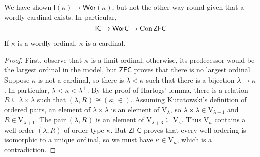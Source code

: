 We have shown \( \mathsf{I}(\kappa) \to \mathsf{Wor}(\kappa) \), but not the other way round given that a wordly cardinal exists.
In particular,
\[ \mathsf{IC} \to \mathsf{WorC} \to \operatorname{Con}{\mathsf{ZFC}} \]
\begin{theorem}
    If \( \kappa \) is a wordly ordinal, \( \kappa \) is a cardinal.
\end{theorem}
\begin{proof}
    First, observe that \( \kappa \) is a limit ordinal; otherwise, its predecessor would be the largest ordinal in the model, but \( \mathsf{ZFC} \) proves that there is no largest ordinal.
    Suppose \( \kappa \) is not a cardinal, so there is \( \lambda < \kappa \) such that there is a bijection \( \lambda \to \kappa \).
    In particular, \( \lambda < \kappa < \lambda^+ \).
    By the proof of Hartogs' lemma, there is a relation \( R \subseteq \lambda \times \lambda \) such that \( (\lambda, R) \cong (\kappa, \in) \).
    Assuming Kuratowski's definition of ordered pairs, an element of \( \lambda \times \lambda \) is an element of \( \mathrm{V}_{\lambda} \), so \( \lambda \times \lambda \in \mathrm{V}_{\lambda + 1} \) and \( R \in \mathrm{V}_{\lambda + 1} \).
    The pair \( (\lambda, R) \) is an element of \( \mathrm{V}_{\lambda + 3} \subseteq \mathrm{V}_{\kappa} \).
    Thus \( \mathrm{V}_\kappa \) contains a well-order \( (\lambda, R) \) of order type \( \kappa \).
    But \( \mathsf{ZFC} \) proves that every well-ordering is isomorphic to a unique ordinal, so we must have \( \kappa \in \mathrm{V}_\kappa \), which is a contradiction.
\end{proof}

